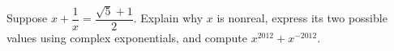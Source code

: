 Suppose $x+\dfrac{1}{x}=\dfrac{\sqrt5+1}{2}$. Explain why $x$ is nonreal, express its two possible values using complex exponentials, and compute $x^{2012}+x^{-2012}$.
